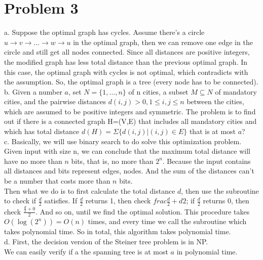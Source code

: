 \documentclass[12pt]{article}
\begin{document}
\section*{Problem 3}

a. Suppose the optimal graph has cycles. Assume there's a circle $u
\to v \to ... \to w \to u$ in the optimal graph, then we can remove
one edge in the circle and still get all nodes connected. Since all
distances are positive integers, the modified graph has less total
distance than the previous optimal graph. In this case, the optimal
graph with cycles is not optimal, which contradicts with the
assumption. So, the optimal graph is a tree (every node has to be
connected). \\

b. Given a number $a$, set $N = \{1,...,n\}$ of n cities, a subset $M
\subseteq N$ of mandatory cities, and the pairwise distances
$d(i,j)>0, 1 \le i,j \le n$ between the cities, which are assumed to
be positive integers and symmetric. The problem is to find out if
there is a connected graph H=(V,E) that includes all mandatory cities
and which has total distance $d(H) = \Sigma \{d(i,j)|(i,j) \in
E \}$ that is at most $a$? \\

c. Basically, we will use binary search to do solve this optimization
problem. \\

Given input with size n, we can conclude that the maximum total
distance will have no more than $n$ bits, that is, no more than
$2^n$. Because the input contains all distances and bits represent
edges, nodes. And the sum of the distances can't be a number that
costs more than $n$ bits. \\

Then what we do is to first calculate the total distance $d$, then use
the subroutine to check if $\frac {d}{2}$ satisfies. If $\frac {d}{2}$
returns 1, then check $frac {\frac {d}{2} + d}{2}$; if $\frac {d}{2}$
returns 0, then check $\frac {\frac {d}{2} + 0}{2}$. And so on, until
we find the optimal solution. This procedure takes $O(\log {(2^n)}) =
O(n)$ times, and every time we call the subroutine which takes
polynomial time. So in total, this algorithm takes polynomial time. \\

d. First, the decision version of the Steiner tree problem is in NP. \\

We can easily verify if a the spanning tree is at most $a$ in
polynomial time. \\
\end{document}
